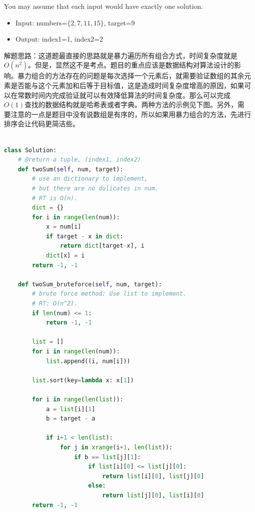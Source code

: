 \documentclass[a4paper,10pt]{article}
\begin{document}
\noindent You may assume that each input would have exactly one solution.
\begin{itemize}
    \item Input: numbers=$\{2, 7, 11, 15\}$, target=9
    \item Output: index1=1, index2=2
\end{itemize}

\begin{CJK*}{UTF8}{gbsn}
\noindent 解题思路：这道题最直接的思路就是暴力遍历所有组合方式，时间复杂度就是$O(n^2)$。但是，显然这不是考点。题目的重点应该是数据结构对算法设计的影响。暴力组合的方法存在的问题是每次选择一个元素后，就需要验证数组的其余元素是否能与这个元素加和后等于目标值，这是造成时间复杂度增高的原因，如果可以在常数时间内完成验证就可以有效降低算法的时间复杂度。那么可以完成$O(1)$查找的数据结构就是哈希表或者字典。两种方法的示例见下图。另外，需要注意的一点是题目中没有说数组是有序的，所以如果用暴力组合的方法，先进行排序会让代码更简洁些。\\
\end{CJK*}

\begin{lstlisting}[language=Python, caption=Problem1. TwoSum]

class Solution:
    # @return a tuple, (index1, index2)
    def twoSum(self, num, target):
        # use an dictionary to implement, 
        # but there are no dulicates in num. 
        # RT is O(n).
        dict = {}
        for i in range(len(num)):
            x = num[i]
            if target - x in dict:
                return dict[target-x], i
            dict[x] = i
        return -1, -1
        
    def twoSum_bruteforce(self, num, target):
        # brute force method: Use list to implement.
        # RT: O(n^2).
        if len(num) <= 1:
            return -1, -1

        list = []
        for i in range(len(num)):
            list.append((i, num[i]))

        list.sort(key=lambda x: x[1])

        for i in range(len(list)):
            a = list[i][1]
            b = target - a

            if i+1 < len(list):
                for j in xrange(i+1, len(list)):
                    if b == list[j][1]:
                        if list[i][0] <= list[j][0]:
                            return list[i][0], list[j][0]
                        else:
                            return list[j][0], list[i][0]
        return -1, -1
\end{lstlisting}
\end{document}
